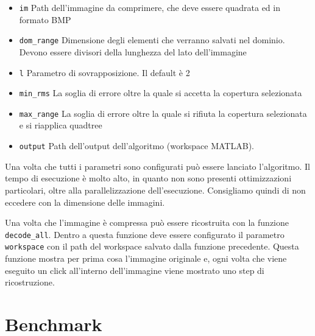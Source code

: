 \documentclass[11pt,a4paper,appendixprefix=true,numbers=noenddot]{scrreprt}
\begin{document}
\begin{itemize}
\item \texttt{im} Path dell'immagine da comprimere, che deve essere quadrata ed in formato BMP
\item \texttt{dom\_range} Dimensione degli elementi che verranno salvati nel dominio. Devono essere divisori della lunghezza del lato dell'immagine
\item \texttt{l} Parametro di sovrapposizione. Il default è 2
\item \texttt{min\_rms} La soglia di errore oltre la quale si accetta la copertura selezionata
\item \texttt{max\_range} La soglia di errore oltre la quale si rifiuta la copertura selezionata e si riapplica quadtree 
\item \texttt{output} Path dell'output dell'algoritmo (workspace MATLAB).
\end{itemize}

Una volta che tutti i parametri sono configurati può essere lanciato l'algoritmo. Il tempo di esecuzione è molto alto, in quanto non sono presenti ottimizzazioni particolari, oltre alla parallelizzazione dell'esecuzione. Consigliamo quindi di non eccedere con la dimensione delle immagini.

Una volta che l'immagine è compressa può essere ricostruita con la funzione \texttt{decode\_all}. Dentro a questa funzione deve essere configurato il parametro \texttt{workspace} con il path del workspace salvato dalla funzione precedente. Questa funzione mostra per prima cosa l'immagine originale e, ogni volta che viene eseguito un click all'interno dell'immagine viene mostrato uno step di ricostruzione.

\section{Benchmark}
\end{document}
